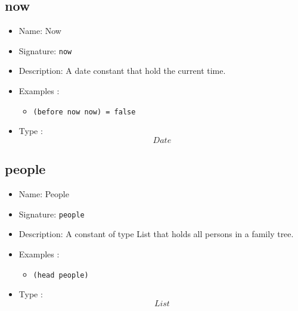 \subsection{now}
\begin{itemize}
    \item Name: Now
    \item Signature: \texttt{now}
    \item Description: A date constant that hold the current time.
    \item Examples :
        \begin{itemize}
            \item \texttt{(before now now) = false}
        \end{itemize}
    \item Type : \[Date\]
\end{itemize}

\subsection{people}
\begin{itemize}
    \item Name: People
    \item Signature: \texttt{people}
    \item Description: A constant of type List that holds all persons in a family tree.
    \item Examples :
        \begin{itemize}
            \item \texttt{(head people)}
        \end{itemize}
    \item Type : \[List\]
\end{itemize}
